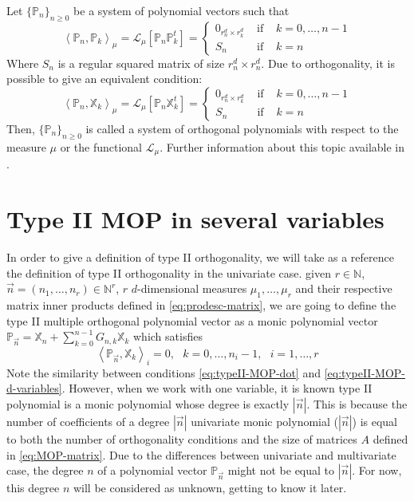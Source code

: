 \documentclass[12pt,a4]{article}
\theoremstyle{plain}
\newcommand{\N}[0]{\mathbb{N}}
\newcommand{\prodesc}[2]{\left\langle #1 , #2 \right\rangle}
\begin{document}
Let $\{\mathbb{P}_n\}_{n\geq 0}$ be a system of polynomial vectors such that
$$
\prodesc{\mathbb P_n}{\mathbb P_k}_\mu = \mathcal{L}_\mu[\mathbb P_n \mathbb P_k^t]= \left\{\begin{array}{ccl}
    0_{r_n^d\times r_k^d} &   \text{ if } & k=0,\dots,n-1 \\
    S_n & \text{ if } & k=n      
\end{array}\right. 
$$
Where $S_n$ is a regular squared matrix of size $r_n^d\times r_n^d$.
Due to orthogonality, it is possible to give an equivalent condition:
\begin{equation}
    \label{eq:prodesc-matrix-PX}
    \prodesc{\mathbb P_n}{\mathbb X_k}_\mu = \mathcal{L}_\mu[\mathbb P_n \mathbb X_k^t]= \left\{\begin{array}{ccl}
        0_{r_n^d\times r_k^d} &   \text{ if } & k=0,\dots,n-1 \\
        S_n & \text{ if } & k=n      
    \end{array}\right. 
\end{equation}
Then, $\{\mathbb{P}_n\}_{n\geq 0}$ is called a system of orthogonal polynomials with respect to the measure $\mu$ or the functional $\mathcal L_\mu$. Further information about this topic available in \cite[Ch. III, Section 3.2]{dunkl_xu_2014}.

\section{Type II MOP in several variables}

In order to give a definition of type II orthogonality, we will take as a reference the definition of type II orthogonality in the univariate case. given $r\in\N$, $\vec n = (n_1,\dots, n_r)\in\N^r$, $r$ $d$-dimensional measures $\mu_1, \dots, \mu_r$ and their respective matrix inner products defined in \eqref{eq:prodesc-matrix}, we are going to define the type II multiple orthogonal polynomial vector as a monic polynomial vector $\mathbb P_{\vec n} = \mathbb X_n + \displaystyle\sum_{k=0}^{n-1}G_{n,k} \mathbb X_k$ which satisfies
\begin{equation}
    \label{eq:typeII-MOP-d-variables}
    \prodesc{\mathbb P_{\vec n}}{\mathbb X_k}_i = 0, \ \ \ k=0,\dots,n_i-1, \ \ \ i=1,\dots,r
\end{equation}
Note the similarity between conditions \eqref{eq:typeII-MOP-dot} and \eqref{eq:typeII-MOP-d-variables}. However, when we work with one variable, it is known type II polynomial is a monic polynomial whose degree is exactly $|\vec n|$. This is because the number of coefficients of a degree $|\vec n|$ univariate monic polynomial ($|\vec n|$) is equal to both the number of orthogonality conditions and the size of matrices $A$ defined in \eqref{eq:MOP-matrix}. Due to the differences between univariate and multivariate case, the degree $n$ of a polynomial vector $\mathbb P_{\vec n}$ might not be equal to $|\vec n|$. For now, this degree $n$ will be considered as unknown, getting to know it later.
\end{document}
